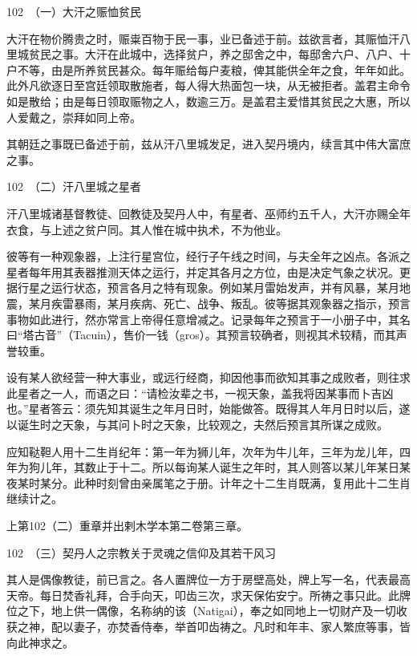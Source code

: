 \documentclass[12pt,UTF8]{ctexbook}
\begin{document}
102　（一）大汗之赈恤贫民

大汗在物价腾贵之时，赈粜百物于民一事，业已备述于前。兹欲言者，其赈恤汗八里城贫民之事。大汗在此城中，选择贫户，养之邸舍之中，每邸舍六户、八户、十户不等，由是所养贫民甚众。每年赈给每户麦粮，俾其能供全年之食，年年如此。此外凡欲逐日至宫廷领取散施者，每人得大热面包一块，从无被拒者。盖君主命令如是散给；由是每日领取赈物之人，数逾三万。是盖君主爱惜其贫民之大惠，所以人爱戴之，崇拜如同上帝。

其朝廷之事既已备述于前，兹从汗八里城发足，进入契丹境内，续言其中伟大富庶之事。





102　（二）汗八里城之星者

汗八里城诸基督教徒、回教徒及契丹人中，有星者、巫师约五千人，大汗亦赐全年衣食，与上述之贫户同。其人惟在城中执术，不为他业。

彼等有一种观象器，上注行星宫位，经行子午线之时间，与夫全年之凶点。各派之星者每年用其表器推测天体之运行，并定其各月之方位，由是决定气象之状况。更据行星之运行状态，预言各月之特有现象。例如某月雷始发声，并有风暴，某月地震，某月疾雷暴雨，某月疾病、死亡、战争、叛乱。彼等据其观象器之指示，预言事物如此进行，然亦常言上帝得任意增减之。记录每年之预言于一小册子中，其名曰“塔古音”（Tacuin），售价一钱（gros）。其预言较确者，则视其术较精，而其声誉较重。

设有某人欲经营一种大事业，或远行经商，抑因他事而欲知其事之成败者，则往求此星者之一人，而语之曰：“请检汝辈之书，一视天象，盖我将因某事而卜吉凶也。”星者答云：须先知其诞生之年月日时，始能做答。既得其人年月日时以后，遂以诞生时之天象，与其问卜时之天象，比较观之，夫然后预言其所谋之成败。

应知鞑靼人用十二生肖纪年：第一年为狮儿年，次年为牛儿年，三年为龙儿年，四年为狗儿年，其数止于十二。所以每询某人诞生之年时，其人则答以某儿年某日某夜某时某分。此种时刻曾由亲属笔之于册。计年之十二生肖既满，复用此十二生肖继续计之。

上第102（二）重章并出剌木学本第二卷第三章。





102　（三）契丹人之宗教关于灵魂之信仰及其若干风习

其人是偶像教徒，前已言之。各人置牌位一方于房壁高处，牌上写一名，代表最高天帝。每日焚香礼拜，合手向天，叩齿三次，求天保佑安宁。所祷之事只此。此牌位之下，地上供一偶像，名称纳的该（Natigai），奉之如同地上一切财产及一切收获之神，配以妻子，亦焚香侍奉，举首叩齿祷之。凡时和年丰、家人繁庶等事，皆向此神求之。
\end{document}
